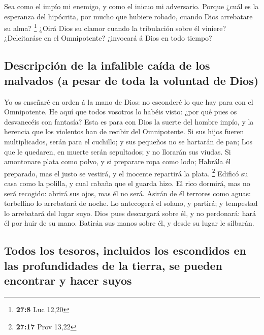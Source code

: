  Sea como el impío mi enemigo, y como el inicuo mi
adversario.  Porque ¿cuál es la esperanza del hipócrita,
por mucho que hubiere robado, cuando Dios arrebatare su alma?
\footnote{\textbf{27:8} Luc 12,20}  ¿Oirá Dios su clamor
cuando la tribulación sobre él viniere?  ¿Deleitaráse en
el Omnipotente? ¿invocará á Dios en todo tiempo?

\hypertarget{descripciuxf3n-de-la-infalible-cauxedda-de-los-malvados-a-pesar-de-toda-la-voluntad-de-dios}{%
\subsection{Descripción de la infalible caída de los malvados (a pesar
de toda la voluntad de
Dios)}\label{descripciuxf3n-de-la-infalible-cauxedda-de-los-malvados-a-pesar-de-toda-la-voluntad-de-dios}}

 Yo os enseñaré en orden á la mano de Dios: no esconderé
lo que hay para con el Omnipotente.  He aquí que todos
vosotros lo habéis visto: ¿por qué pues os desvanecéis con fantasía?
 Esta es para con Dios la suerte del hombre impío, y la
herencia que los violentos han de recibir del Omnipotente.
 Si sus hijos fueren multiplicados, serán para el
cuchillo; y sus pequeños no se hartarán de pan;  Los que
le quedaren, en muerte serán sepultados; y no llorarán sus viudas.
 Si amontonare plata como polvo, y si preparare ropa como
lodo;  Habrála él preparado, mas el justo se vestirá, y
el inocente repartirá la plata. \footnote{\textbf{27:17} Prov 13,22}
 Edificó su casa como la polilla, y cual cabaña que el
guarda hizo.  El rico dormirá, mas no será recogido:
abrirá sus ojos, mas él no será.  Asirán de él terrores
como aguas: torbellino lo arrebatará de noche.  Lo
antecogerá el solano, y partirá; y tempestad lo arrebatará del lugar
suyo.  Dios pues descargará sobre él, y no perdonará:
hará él por huir de su mano.  Batirán sus manos sobre él,
y desde su lugar le silbarán.

\hypertarget{todos-los-tesoros-incluidos-los-escondidos-en-las-profundidades-de-la-tierra-se-pueden-encontrar-y-hacer-suyos}{%
\subsection{Todos los tesoros, incluidos los escondidos en las
profundidades de la tierra, se pueden encontrar y hacer
suyos}\label{todos-los-tesoros-incluidos-los-escondidos-en-las-profundidades-de-la-tierra-se-pueden-encontrar-y-hacer-suyos}}

